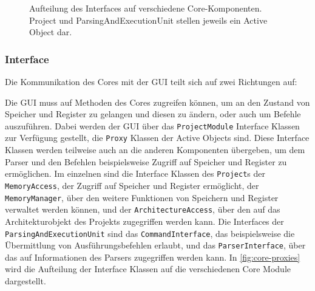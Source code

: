 \begin{figure}[H]
\begin{center}

    \end{center}
    \caption{Aufteilung des Interfaces auf verschiedene Core-Komponenten. Project und ParsingAndExecutionUnit stellen jeweils ein Active Object dar.}
    \label{fig:core-proxies}
\end{figure}

\subsubsection{Interface}

Die Kommunikation des Cores mit der GUI teilt sich auf zwei Richtungen auf:

Die GUI muss auf Methoden des Cores zugreifen können, um an den Zustand von
Speicher und Register zu gelangen und diesen zu ändern, oder auch um Befehle
auszuführen. Dabei werden der GUI über das \texttt{ProjectModule} Interface
Klassen zur Verfügung gestellt, die \texttt{Proxy} Klassen der Active Objects
sind. Diese Interface Klassen werden teilweise auch an die anderen Komponenten
übergeben, um dem Parser und den Befehlen beispielsweise Zugriff auf Speicher
und Register zu ermöglichen. Im einzelnen sind die Interface Klassen des
\texttt{Project}s der \texttt{MemoryAccess}, der Zugriff auf Speicher und
Register ermöglicht, der \texttt{MemoryManager}, über den weitere Funktionen von
Speichern und Register verwaltet werden können, und der
\texttt{ArchitectureAccess}, über den auf das Architekturobjekt des Projekts
zugegriffen werden kann. Die Interfaces der \texttt{ParsingAndExecutionUnit}
sind das \texttt{CommandInterface}, das beispielsweise die Übermittlung von
Ausführungsbefehlen erlaubt, und das \texttt{ParserInterface}, über das auf
Informationen des Parsers zugegriffen werden kann. In \autoref{fig:core-proxies}
wird die Aufteilung der Interface Klassen auf die verschiedenen Core Module
dargestellt.

